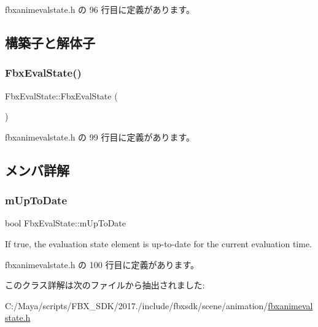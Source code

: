  fbxanimevalstate.\+h の 96 行目に定義があります。



\subsection{構築子と解体子}
\mbox{\label{class_fbx_eval_state_a9c54619a6fa810228fbb017965492507}} 
\subsubsection{\texorpdfstring{Fbx\+Eval\+State()}{FbxEvalState()}}
{\footnotesize\ttfamily Fbx\+Eval\+State\+::\+Fbx\+Eval\+State (\begin{DoxyParamCaption}{ }\end{DoxyParamCaption})\hspace{0.3cm}{\ttfamily [inline]}}



 fbxanimevalstate.\+h の 99 行目に定義があります。



\subsection{メンバ詳解}
\mbox{\label{class_fbx_eval_state_a9c153054cba876e54d38046e582b32d0}} 
\subsubsection{\texorpdfstring{m\+Up\+To\+Date}{mUpToDate}}
{\footnotesize\ttfamily bool Fbx\+Eval\+State\+::m\+Up\+To\+Date}



If {\ttfamily true}, the evaluation state element is up-\/to-\/date for the current evaluation time. 



 fbxanimevalstate.\+h の 100 行目に定義があります。



このクラス詳解は次のファイルから抽出されました\+:\begin{DoxyCompactItemize}
\item 
C\+:/\+Maya/scripts/\+F\+B\+X\+\_\+\+S\+D\+K/2017./include/fbxsdk/scene/animation/\hyperlink{fbxanimevalstate_8h}{fbxanimevalstate.\+h}\end{DoxyCompactItemize}
